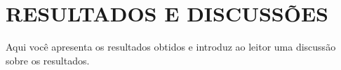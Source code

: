 \chapter{RESULTADOS E DISCUSSÕES}

Aqui você apresenta os resultados obtidos e introduz ao leitor uma discussão sobre os resultados.


